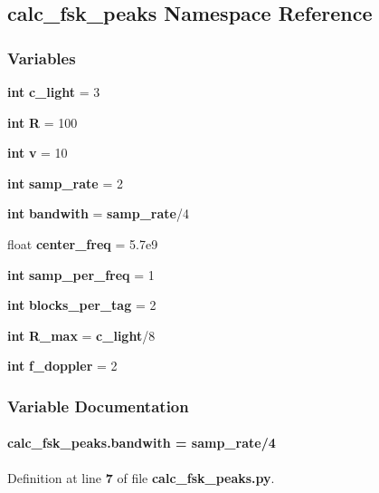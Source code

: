 \subsection{calc\+\_\+fsk\+\_\+peaks Namespace Reference}
\label{namespacecalc__fsk__peaks}
\subsubsection*{Variables}
\begin{DoxyCompactItemize}
\item 
{\bf int} {\bf c\+\_\+light} = 3
\item 
{\bf int} {\bf R} = 100
\item 
{\bf int} {\bf v} = 10
\item 
{\bf int} {\bf samp\+\_\+rate} = 2
\item 
{\bf int} {\bf bandwith} = {\bf samp\+\_\+rate}/4
\item 
float {\bf center\+\_\+freq} = 5.\+7e9
\item 
{\bf int} {\bf samp\+\_\+per\+\_\+freq} = 1
\item 
{\bf int} {\bf blocks\+\_\+per\+\_\+tag} = 2
\item 
{\bf int} {\bf R\+\_\+max} = {\bf c\+\_\+light}/8
\item 
{\bf int} {\bf f\+\_\+doppler} = 2
\end{DoxyCompactItemize}


\subsubsection{Variable Documentation}
\paragraph[{bandwith}]{ calc\+\_\+fsk\+\_\+peaks.\+bandwith = {\bf samp\+\_\+rate}/4}\label{namespacecalc__fsk__peaks_ad30b5e50127d7b652bf9a6c66e1fc5d2}


Definition at line {\bf 7} of file {\bf calc\+\_\+fsk\+\_\+peaks.\+py}.


